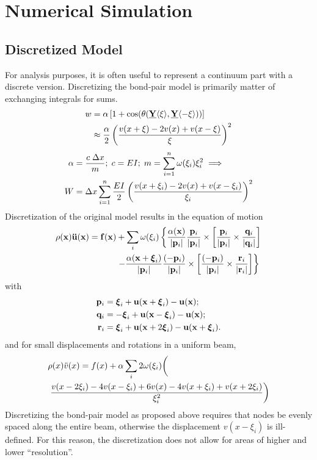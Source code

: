 \documentclass[5p,twocolumn]{elsarticle}
\newcommand\vstate[3]{%
	\mathbf{\underline{#1}}%
	\ifstrempty{#2}{}{[#2]}%
	\ifstrempty{#3}{}{\langle #3 \rangle}}
\begin{document}
\section{Numerical Simulation}
\label{sec:Numerical}
\subsection{Discretized Model}
\label{sec:Discretized}
For analysis purposes, it is often useful to represent a continuum part with a discrete version. 
Discretizing the bond-pair model is primarily matter of exchanging integrals for sums. 
%
\begin{align}
w &= \alpha \left[1+\cos(\theta(\vstate{Y}{}{\xi},\vstate{Y}{}{\mathbf{-\xi}})) \right] \notag \\
&\approx \frac{\alpha}{2}\left(\frac{v(x+\xi)-2v(x)+v(x-\xi)}{\xi}\right)^2 \notag
\end{align}
%
\begin{align}
\label{eq:discretebeam}
\alpha &= \frac{c\; \Delta x}{m} ;\; c= EI ;\; m=\sum_{i=1}^n \omega(\xi_i)\xi_i^2 \implies \nonumber \\
W&=\Delta x \sum_{i=1}^n \frac{EI}{2}\left(\frac{v(x+\xi_i)-2v(x)+v(x-\xi_i)}{\xi_i}\right)^2\notag
\end{align}
%
Discretization of the original model results in the equation of motion
\begin{align}
\rho(\mathbf{x})\mathbf{\ddot{u}}(\mathbf{x}) = \mathbf{f}(\mathbf{x})&+\sum_i \omega(\xi_i)\left\{\frac{\alpha(\mathbf{x})}{|\mathbf{p}_i |}\frac{\mathbf{p}_i}{|\mathbf{p}_i |}\times \left[ \frac{\mathbf{p}_i}{|\mathbf{p}_i |}\times \frac{\mathbf{q}_i}{|\mathbf{q}_i |}\right] \right. \notag \\
& \left. -\frac{\alpha(\mathbf{x}+\boldsymbol{\xi}_i)}{|\mathbf{p}_i |}\frac{(-\mathbf{p}_i)}{|\mathbf{p}_i |}\times\left[\frac{(-\mathbf{p}_i)}{|\mathbf{p}_i |}\times \frac{\mathbf{r}_i}{|\mathbf{r}_i |} \right] \right\} \notag
\end{align}
with
\begin{align}
\mathbf{p}_i &= \boldsymbol{\xi}_i+\mathbf{u}(\mathbf{x}+\boldsymbol{\xi}_i)-\mathbf{u}(\mathbf{x});\notag\\
\mathbf{q}_i &= -\boldsymbol{\xi}_i+\mathbf{u}(\mathbf{x}-\boldsymbol{\xi}_i)-\mathbf{u}(\mathbf{x});\notag\\
\mathbf{r}_i &= \boldsymbol{\xi}_i+\mathbf{u}(\mathbf{x}+2\boldsymbol{\xi}_i)-\mathbf{u}(\mathbf{x}+\boldsymbol{\xi}_i).\notag
\end{align}
and for small displacements and rotations in a uniform beam,
\begin{align}
&\rho(x)\ddot{v}(x) = f(x)+\alpha \sum_i 2\omega(\xi_i)\bigg( \notag\\
&\left. \frac{v(x-2\xi_i)-4v(x-\xi_i)+6v(x)-4v(x+\xi_i)+v(x+2\xi_i)}{\xi_i^2}\right) \notag
\end{align}
Discretizing the bond-pair model as proposed above requires that nodes be evenly spaced along the entire beam, otherwise the displacement \(v(x-\xi_i)\) is ill-defined. 
For this reason, the discretization does not allow for areas of higher and lower ``resolution''. 
%
\end{document}
